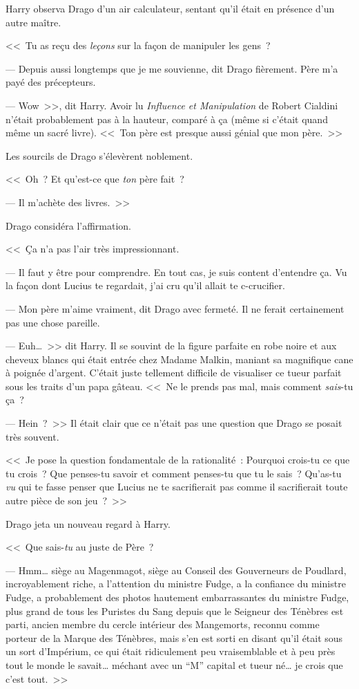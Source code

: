 Harry observa Drago d'un air calculateur, sentant qu'il était en présence d'un autre maître.

<<~Tu as reçu des \emph{leçons} sur la façon de manipuler les gens~?

--- Depuis aussi longtemps que je me souvienne, dit Drago fièrement. Père m'a payé des précepteurs.

--- Wow~>>, dit Harry. Avoir lu \emph{Influence et Manipulation} de Robert Cialdini n'était probablement pas à la hauteur, comparé à ça (même si c'était quand même un sacré livre). <<~Ton père est presque aussi génial que mon père.~>>

Les sourcils de Drago s'élevèrent noblement.

<<~Oh~? Et qu'est-ce que \emph{ton} père fait~?

--- Il m'achète des livres.~>>

Drago considéra l'affirmation.

<<~Ça n'a pas l'air très impressionnant.

--- Il faut y être pour comprendre. En tout cas, je suis content d'entendre ça. Vu la façon dont Lucius te regardait, j'ai cru qu'il allait te c-crucifier.

--- Mon père m'aime vraiment, dit Drago avec fermeté. Il ne ferait certainement pas une chose pareille.

--- Euh…~>> dit Harry. Il se souvint de la figure parfaite en robe noire et aux cheveux blancs qui était entrée chez Madame Malkin, maniant sa magnifique cane à poignée d'argent. C'était juste tellement difficile de visualiser ce tueur parfait sous les traits d'un papa gâteau. <<~Ne le prends pas mal, mais comment \emph{sais}-tu ça~?

--- Hein~?~>> Il était clair que ce n'était pas une question que Drago se posait très souvent.

<<~Je pose la question fondamentale de la rationalité~: Pourquoi crois-tu ce que tu crois~? Que penses-tu savoir et comment penses-tu que tu le sais~? Qu'as-tu \emph{vu} qui te fasse penser que Lucius ne te sacrifierait pas comme il sacrifierait toute autre pièce de son jeu~?~>>

Drago jeta un nouveau regard à Harry.

<<~Que sais-\emph{tu} au juste de Père~?

--- Hmm… siège au Magenmagot, siège au Conseil des Gouverneurs de Poudlard, incroyablement riche, a l'attention du ministre Fudge, a la confiance du ministre Fudge, a probablement des photos hautement embarrassantes du ministre Fudge, plus grand de tous les Puristes du Sang depuis que le Seigneur des Ténèbres est parti, ancien membre du cercle intérieur des Mangemorts, reconnu comme porteur de la Marque des Ténèbres, mais s'en est sorti en disant qu'il était sous un sort d'Impérium, ce qui était ridiculement peu vraisemblable et à peu près tout le monde le savait… méchant avec un “M” capital et tueur né… je crois que c'est tout.~>>

